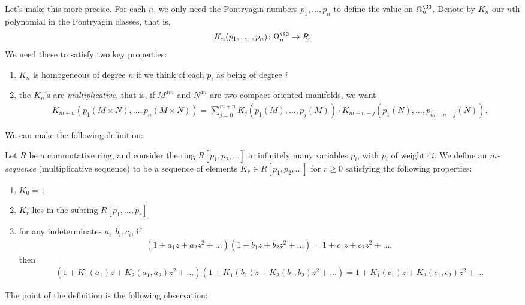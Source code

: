 \documentclass[11pt]{book}
\begin{document}
Let's make this more precise. For each $n$, we only need the Pontryagin numbers $p_1, \ldots, p_n$ to define the value on $\Omega^\SO_n$. Denote by $K_n$ our $n$th polynomial in the Pontryagin classes, that is,
\begin{align*}
    K_n(p_1, \ldots, p_n) \colon \Omega^{\SO}_n \to R.
\end{align*}
We need these to satisfy two key properties:
\begin{enumerate}
    \item $K_n$ is homogeneous of degree $n$ if we think of each $p_i$ as being of degree $i$
    \item the $K_n$'s are \emph{multiplicative}, that is, if $M^{4m}$ and $N^{4n}$ are two compact oriented manifolds, we want
\begin{align*}
    K_{m+n}(p_1(M \times N), \ldots, p_n(M \times N)) = \sum_{j=0}^{m+n} K_j(p_1(M), \ldots, p_j(M)) \cdot K_{m+n-j}(p_1(N), \ldots, p_{m+n-j}(N)).
\end{align*}
\end{enumerate}

We can make the following definition:

\begin{definition}\label{def:m-sequence} Let $R$ be a commutative ring, and consider the ring $R[p_1,p_2,\ldots]$ in infinitely many variables $p_i$, with $p_i$ of weight $4i$. We define an \emph{$m$-sequence} (multiplicative sequence) to be a sequence of elements $K_r \in R[p_1,p_2,\ldots ]$ for $r\ge 0$ satisfying the following properties:
\begin{enumerate}
    \item $K_0 = 1$
    \item $K_r$ lies in the subring $R[p_1, \ldots, p_r]$
    \item for any indeterminates $a_i,b_i,c_i$, if
    \begin{align*}
        \left( 1 + a_1 z + a_2 z^2 + \ldots  \right)\left( 1 + b_1 z + b_2z^2 + \ldots  \right) = 1 + c_1 z + c_2 z^2 + \ldots,
    \end{align*}
    then
    \begin{align*}
        \left( 1 + K_1(a_1)z + K_2(a_1,a_2)z^2 + \ldots \right)\left( 1 + K_1(b_1)z + K_2(b_1,b_2)z^2 + \ldots \right) = 1 + K_1(c_1)z + K_2(c_1,c_2)z^2 + \ldots
    \end{align*}
\end{enumerate}
\end{definition}
The point of the definition is the following observation:
\end{document}
